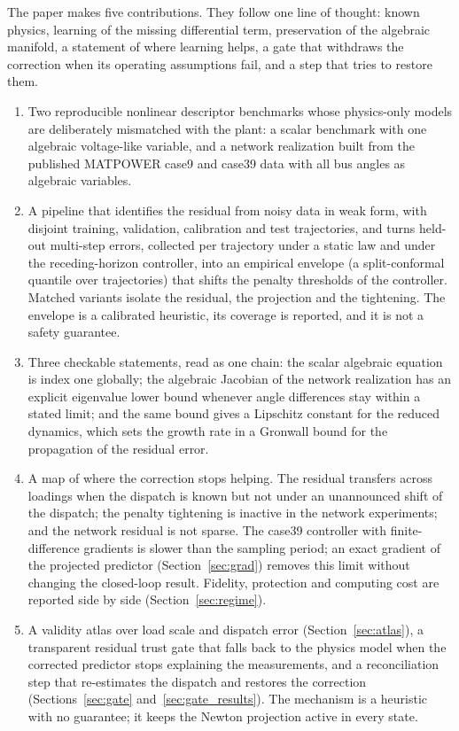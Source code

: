 \documentclass[preprint,12pt]{elsarticle}
\begin{document}
The paper makes five contributions. They follow one line of thought: known physics, learning of the missing differential term, preservation of the algebraic manifold, a statement of where learning helps, a gate that withdraws the correction when its operating assumptions fail, and a step that tries to restore them.
\begin{enumerate}
\item Two reproducible nonlinear descriptor benchmarks whose physics-only models are deliberately mismatched with the plant: a scalar benchmark with one algebraic voltage-like variable, and a network realization built from the published MATPOWER case9 and case39 data with all bus angles as algebraic variables.
\item A pipeline that identifies the residual from noisy data in weak form, with disjoint training, validation, calibration and test trajectories, and turns held-out multi-step errors, collected per trajectory under a static law and under the receding-horizon controller, into an empirical envelope (a split-conformal quantile over trajectories) that shifts the penalty thresholds of the controller. Matched variants isolate the residual, the projection and the tightening. The envelope is a calibrated heuristic, its coverage is reported, and it is not a safety guarantee.
\item Three checkable statements, read as one chain: the scalar algebraic equation is index one globally; the algebraic Jacobian of the network realization has an explicit eigenvalue lower bound whenever angle differences stay within a stated limit; and the same bound gives a Lipschitz constant for the reduced dynamics, which sets the growth rate in a Gronwall bound for the propagation of the residual error.
\item A map of where the correction stops helping. The residual transfers across loadings when the dispatch is known but not under an unannounced shift of the dispatch; the penalty tightening is inactive in the network experiments; and the network residual is not sparse. The case39 controller with finite-difference gradients is slower than the sampling period; an exact gradient of the projected predictor (Section~\ref{sec:grad}) removes this limit without changing the closed-loop result. Fidelity, protection and computing cost are reported side by side (Section~\ref{sec:regime}).
\item A validity atlas over load scale and dispatch error (Section~\ref{sec:atlas}), a transparent residual trust gate that falls back to the physics model when the corrected predictor stops explaining the measurements, and a reconciliation step that re-estimates the dispatch and restores the correction (Sections~\ref{sec:gate} and~\ref{sec:gate_results}). The mechanism is a heuristic with no guarantee; it keeps the Newton projection active in every state.
\end{enumerate}
\end{document}
